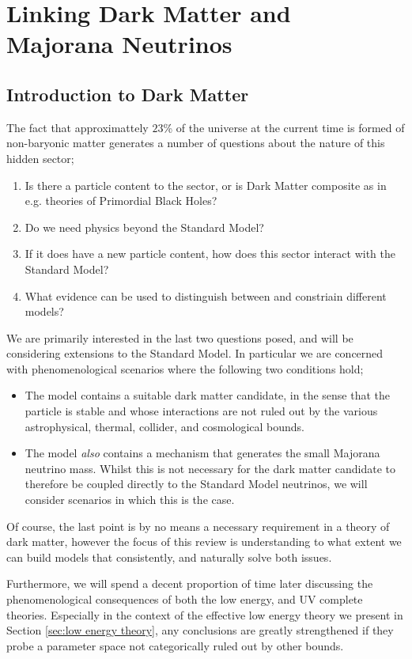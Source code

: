 \documentclass[10pt]{article}
\begin{document}
\section{Linking Dark Matter and Majorana Neutrinos}
\subsection{Introduction to Dark Matter}
The fact that approximattely $23$\% of the universe at the current time is formed of non-baryonic matter generates a number of questions about the nature of this hidden sector;
\begin{enumerate}
  \item Is there a particle content to the sector, or is Dark Matter composite as in e.g. theories of Primordial Black Holes? \cite{Carr}
  \item Do we need physics beyond the Standard Model?
  \item If it does have a new particle content, how does this sector interact with the Standard Model?
  \item What evidence can be used to distinguish between and constriain different models?
\end{enumerate}
We are primarily interested in the last two questions posed, and will be considering extensions to the Standard Model. In particular we are concerned with phenomenological scenarios where the following two conditions hold;
\begin{itemize}
  \item The model contains a suitable dark matter candidate, in the sense that the particle is stable and whose interactions are not ruled out by the various astrophysical, thermal, collider, and cosmological bounds.
  \item The model \textit{also} contains a mechanism that generates the small Majorana neutrino mass. Whilst this is not necessary for the dark matter candidate to therefore be coupled directly to the Standard Model neutrinos, we will consider scenarios in which this is the case.
\end{itemize}
Of course, the last point is by no means a necessary requirement in a theory of dark matter, however the focus of this review is understanding to what extent we can build models that consistently, and naturally solve both issues.

Furthermore, we will spend a decent proportion of time later discussing the phenomenological consequences of both the low energy, and UV complete theories. Especially in the context of the effective low energy theory we present in Section \ref{sec:low energy theory}, any conclusions are greatly strengthened if they probe a parameter space not categorically ruled out by other bounds.
\end{document}
